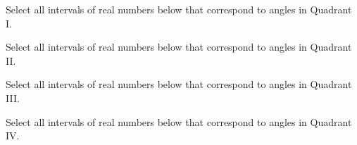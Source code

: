 \documentclass{ximera}
\begin{document}
\begin{exercise}
Select all intervals of real numbers below that correspond to angles in Quadrant I. 
\begin{selectAll}
\choice[correct]{$\left[\frac{\pi}{12}, \frac{\pi}{6}\right)$}
\choice{$\left(3.5, 4\right]$}
\choice{$\left[2, 3\right]$}
\end{selectAll}

Select all intervals of real numbers below that correspond to angles in Quadrant II. 
\begin{selectAll}
\choice{$\left[\frac{\pi}{12}, \frac{\pi}{6}\right)$}
\choice{$\left(3.5, 4\right]$}
\choice[correct]{$\left[2, 3\right]$}
\end{selectAll}

Select all intervals of real numbers below that correspond to angles in Quadrant III. 
\begin{selectAll}
\choice{$\left[\frac{\pi}{12}, \frac{\pi}{6}\right)$}
\choice[correct]{$\left(3.5, 4\right]$}
\choice{$\left[2, 3\right]$}
\end{selectAll}

Select all intervals of real numbers below that correspond to angles in Quadrant IV. 
\begin{selectAll}
\choice{$\left[\frac{\pi}{12}, \frac{\pi}{6}\right)$}
\choice{$\left(3.5, 4\right]$}
\choice{$\left[2, 3\right]$}
\end{selectAll}

\end{exercise}
\end{document}
